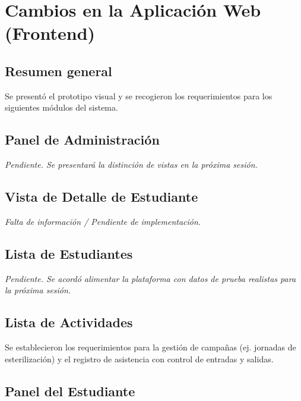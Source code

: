 \section{Cambios en la Aplicación Web
(Frontend)}\label{cambios-en-la-aplicaciuxf3n-web-frontend}

\subsection{Resumen general}\label{resumen-general-1}

Se presentó el prototipo visual y se recogieron los requerimientos para
los siguientes módulos del sistema.

\subsection{Panel de Administración}\label{panel-de-administraciuxf3n}

\emph{Pendiente. Se presentará la distinción de vistas en la próxima
sesión.}

\subsection{Vista de Detalle de
Estudiante}\label{vista-de-detalle-de-estudiante}

\emph{Falta de información / Pendiente de implementación.}

\subsection{Lista de Estudiantes}\label{lista-de-estudiantes}

\emph{Pendiente. Se acordó alimentar la plataforma con datos de prueba
realistas para la próxima sesión.}

\subsection{Lista de Actividades}\label{lista-de-actividades}

Se establecieron los requerimientos para la gestión de campañas (ej.
jornadas de esterilización) y el registro de asistencia con control de
entradas y salidas.

\subsection{Panel del Estudiante}\label{panel-del-estudiante}

